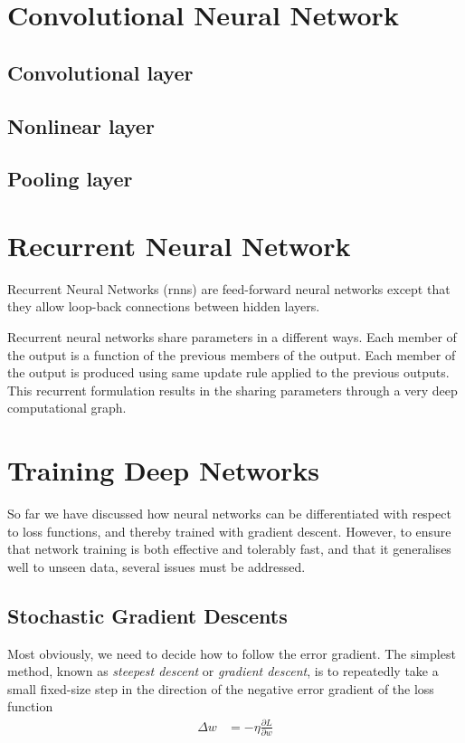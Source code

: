 \section{Convolutional Neural Network}
\subsection{Convolutional layer}

\subsection{Nonlinear layer}

\subsection{Pooling layer}

\section{Recurrent Neural Network}
Recurrent Neural Networks (\gls{rnn}s) are feed-forward neural networks except that they allow loop-back connections between hidden layers. 


Recurrent neural networks share parameters in a different ways. Each member of the output is a function of the previous members of the output. Each member of the output is produced using same update rule applied to the previous outputs. This recurrent formulation results in the sharing parameters through a very deep computational graph.

\section{Training Deep Networks}
So far we have discussed how neural networks can be differentiated with respect to loss functions, and thereby trained with gradient descent. However, to ensure that network training is both effective and tolerably fast, and that it generalises well to unseen data, several issues must be addressed.

\subsection{Stochastic Gradient Descents}
Most obviously, we need to decide how to follow the error gradient. The simplest method, known as \textit{steepest descent} or \textit{gradient descent}, is to repeatedly take a small fixed-size step in the direction of the negative error gradient of the loss function
\begin{align}
	\Delta w & = -\eta \frac{\partial L}{\partial w}
\end{align}
